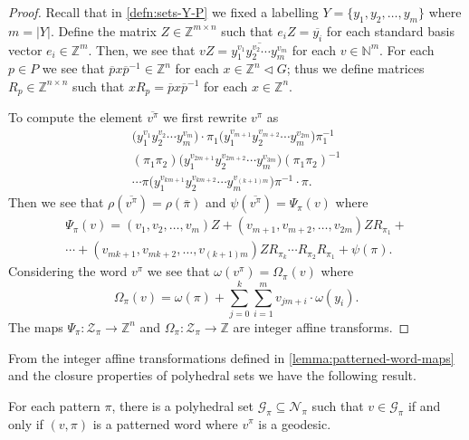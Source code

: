 \begin{proof}

Recall that in \cref{defn:sets-Y-P} we fixed a labelling $Y = \{y_1, y_2, \ldots, y_m\}$ where $m  = |Y|$.
Define the matrix $Z \in \mathbb{Z}^{m \times n}$ such that $e_i Z = \overline{y_i}$ for each standard basis vector $e_i \in \mathbb{Z}^m$.
Then, we see that $vZ = \overline{y_1^{v_1}y_2^{v_2} \cdots y_m^{v_m}}$ for each $v \in \mathbb{N}^m$.
For each $p \in P$ we see that $\overline{p} x \overline{p}^{-1} \in \mathbb{Z}^n$ for each $x \in \mathbb{Z}^n \triangleleft G$; thus we define matrices $R_p \in \mathbb{Z}^{n \times n}$ such that $x R_p = \overline{p} x \overline{p}^{-1}$ for each $x \in \mathbb{Z}^n$.

To compute the element $\overline{v^\pi}$ we first rewrite $v^\pi$ as
\begin{multline*}
	\Big(
		y_1^{v_{1}}
		y_2^{v_{2}}
		\cdots
		y_m^{v_{m}}
	\Big)
	\cdot
	\pi_1
	\Big(
		y_1^{v_{m+1}}
		y_2^{v_{m+2}}
		\cdots
		y_m^{v_{2m}}
	\Big)
	\pi_1^{-1}
	\\
	(\pi_1 \pi_2)
	\Big(
		y_1^{v_{2m+1}}
		y_2^{v_{2m+2}}
		\cdots
		y_m^{v_{3m}}
	\Big)
	(\pi_1 \pi_2)^{-1}
	\\
	\cdots
	\pi
	\Big(
		y_1^{v_{km+1}}
		y_2^{v_{km+2}}
		\cdots
		y_m^{v_{(k+1)m}}
	\Big)
	\pi^{-1}
	\cdot
	\pi.
\end{multline*}
Then we see that $\rho(\overline{v^\pi}) = \rho(\overline{\pi})$ and $\psi(\overline{v^\pi}) = \Psi_{\pi}(v)$ where
\begin{multline*}
	\Psi_{\pi}(v)
	=
	(v_1,v_2,\ldots,v_m) Z +
	(v_{m+1},v_{m+2},\ldots,v_{2m}) Z R_{\pi_1} +\\
	\cdots +
	(v_{mk+1},v_{mk+2},\ldots,v_{(k+1)m}) Z R_{\pi_k} \cdots R_{\pi_2} R_{\pi_1}
	+ \psi(\pi).
\end{multline*}
Considering the word $v^\pi$ we see that $\omega(v^\pi) = \Omega_{\pi}(v)$ where
\[
	\Omega_{\pi}(v)
	=
	\omega(\pi) +
	\sum_{j=0}^k \sum_{i=1}^m
		v_{jm+i} \cdot \omega(y_i).
\]
The maps $\Psi_{\pi} \colon \mathcal{Z}_\pi \to \mathbb{Z}^n$ and $\Omega_{\pi} \colon \mathcal{Z}_\pi \to \mathbb{Z}$ are integer affine transforms.
\end{proof}

From the integer affine transformations defined in \cref{lemma:patterned-word-maps} and the closure properties of polyhedral sets we have the following result.

\begin{lemma}\label{lemma:geodesics-in-special-form}
	For each pattern $\pi$, there is a polyhedral set $\mathcal{G}_{\pi} \subseteq \mathcal{N}_\pi$ such that $v \in \mathcal{G}_{\pi}$ if and only if $(v,\pi)$ is a patterned word where $v^\pi$ is a geodesic.
\end{lemma}

